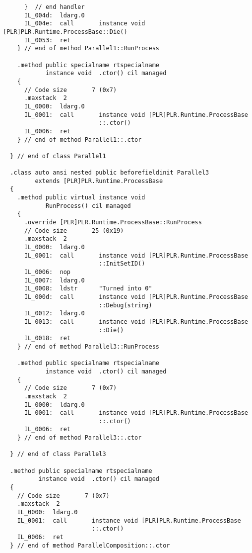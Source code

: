 \begin{lstlisting}
      }  // end handler
      IL_004d:  ldarg.0
      IL_004e:  call       instance void [PLR]PLR.Runtime.ProcessBase::Die()
      IL_0053:  ret
    } // end of method Parallel1::RunProcess

    .method public specialname rtspecialname 
            instance void  .ctor() cil managed
    {
      // Code size       7 (0x7)
      .maxstack  2
      IL_0000:  ldarg.0
      IL_0001:  call       instance void [PLR]PLR.Runtime.ProcessBase
                           ::.ctor()
      IL_0006:  ret
    } // end of method Parallel1::.ctor

  } // end of class Parallel1

  .class auto ansi nested public beforefieldinit Parallel3
         extends [PLR]PLR.Runtime.ProcessBase
  {
    .method public virtual instance void 
            RunProcess() cil managed
    {
      .override [PLR]PLR.Runtime.ProcessBase::RunProcess
      // Code size       25 (0x19)
      .maxstack  2
      IL_0000:  ldarg.0
      IL_0001:  call       instance void [PLR]PLR.Runtime.ProcessBase
                           ::InitSetID()
      IL_0006:  nop
      IL_0007:  ldarg.0
      IL_0008:  ldstr      "Turned into 0"
      IL_000d:  call       instance void [PLR]PLR.Runtime.ProcessBase
                           ::Debug(string)
      IL_0012:  ldarg.0
      IL_0013:  call       instance void [PLR]PLR.Runtime.ProcessBase
                           ::Die()
      IL_0018:  ret
    } // end of method Parallel3::RunProcess

    .method public specialname rtspecialname 
            instance void  .ctor() cil managed
    {
      // Code size       7 (0x7)
      .maxstack  2
      IL_0000:  ldarg.0
      IL_0001:  call       instance void [PLR]PLR.Runtime.ProcessBase
                           ::.ctor()
      IL_0006:  ret
    } // end of method Parallel3::.ctor

  } // end of class Parallel3

  .method public specialname rtspecialname 
          instance void  .ctor() cil managed
  {
    // Code size       7 (0x7)
    .maxstack  2
    IL_0000:  ldarg.0
    IL_0001:  call       instance void [PLR]PLR.Runtime.ProcessBase
                         ::.ctor()
    IL_0006:  ret
  } // end of method ParallelComposition::.ctor


\end{lstlisting}
